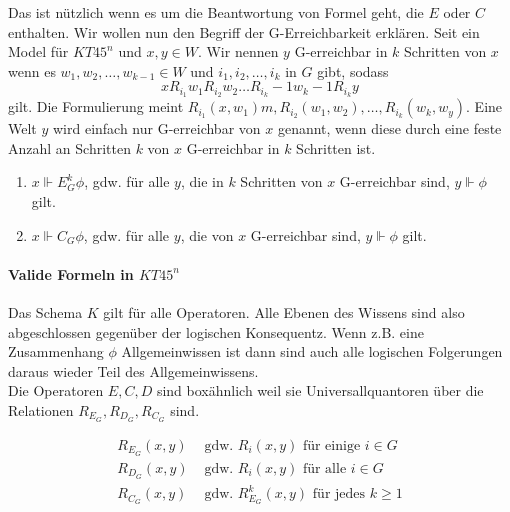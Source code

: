 Das  ist nützlich wenn es um die Beantwortung von Formel geht, die $E$ oder $C$ enthalten.
Wir wollen nun den Begriff der G-Erreichbarkeit erklären.
Seit \MMModelDef ein Model für $KT45^n$ und $x,y \in W$.
Wir nennen $y$ G-erreichbar in $k$ Schritten von $x$ wenn es $w_1, w_2, \dots, w_{k-1} \in W$ und $i_1, i_2, \dots, i_k$ in $G$ gibt, sodass 
\begin{equation*}
	x R_i_1 w_1 R_i_2 w_2 \dots R_i_k-1 w_k-1 R_i_k y
\end{equation*}
gilt.
Die Formulierung meint $R_i_1(x,w_1)m, R_i_2(w_1,w_2), \dots, R_i_k(w_k,w_y)$.
Eine Welt $y$ wird einfach nur G-erreichbar von $x$ genannt, wenn diese durch eine feste Anzahl an Schritten $k$ von $x$ G-erreichbar in $k$ Schritten ist.

\begin{theorem}
	\label{theo:gErreichbarkeit}
	\newline
	\begin{enumerate}
		\item $x \Vdash E_{G}^{k} \phi$, gdw. für alle $y$, die in $k$ Schritten von $x$ G-erreichbar sind, $y \Vdash \phi$ gilt.
		\item $x \Vdash C_{G} \phi$, gdw. für alle $y$, die von $x$ G-erreichbar sind, $y \Vdash \phi$ gilt.
	\end{enumerate}
\end{theorem}



\paragraph{Valide Formeln in $KT45^n$}

Das Schema $K$ gilt für alle Operatoren.
Alle Ebenen des Wissens sind also abgeschlossen gegenüber der logischen Konsequentz.
Wenn z.B. eine Zusammenhang $\phi$ Allgemeinwissen ist dann sind auch alle logischen Folgerungen daraus wieder Teil des Allgemeinwissens.\\
Die Operatoren $E,C,D$ sind boxähnlich weil sie Universallquantoren über die Relationen $R_{E_G}, R_{D_G}, R_{C_G}$ sind.

\begin{equation*}
	\begin{align}
		R_{E_G}(x,y) &\text{ gdw. } R_i(x,y) \text{ für einige } i \in G\\
		R_{D_G}(x,y) &\text{ gdw. } R_i(x,y) \text{ für alle } i \in G\\
		R_{C_G}(x,y) &\text{ gdw. } R_{E_G}^k(x,y) \text{ für jedes } k \geq 1
	\end{align}
\end{equation*}

